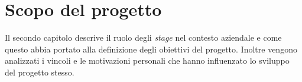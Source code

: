 \chapter{Scopo del progetto}
Il secondo capitolo descrive il ruolo degli \textit{stage} nel contesto aziendale e come questo abbia portato alla definizione degli obiettivi del progetto.
Inoltre vengono analizzati i vincoli e le motivazioni personali che hanno influenzato lo sviluppo del progetto stesso.






